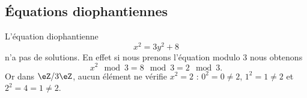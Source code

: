 \subsection{Équations diophantiennes}

\begin{example}
    L'équation diophantienne
    \begin{equation}
        x^2=3y^2+8
    \end{equation}
    n'a pas de solutions. En effet si nous prenons l'équation modulo \( 3\) nous obtenons
    \begin{equation}
        x^2\mod 3=8\mod 3=2\mod 3.
    \end{equation}
    Or dans \( \eZ/3\eZ\), aucun élément ne vérifie \( x^2=2\) : \( 0^2=0\neq 2\), \( 1^2=1\neq 2\) et \( 2^2=4=1\neq 2\).
\end{example}

